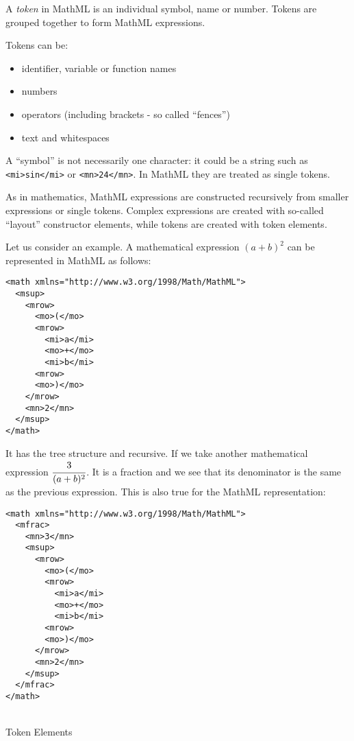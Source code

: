 A \emph{token} in MathML is an individual symbol, name or number. Tokens
are grouped together to form MathML expressions.

Tokens can be:

\begin{itemize}
\itemsep1pt\parskip0pt
\item
  identifier, variable or function names
\item
  numbers
\item
  operators (including brackets - so called ``fences'')
\item
  text and whitespaces
\end{itemize}

A ``symbol'' is not necessarily one character: it could be a string such
as \texttt{<mi>sin</mi>}
or \texttt{<mn>24</mn>}.
In MathML they are treated as single tokens.


As in mathematics, MathML expressions are constructed recursively from
smaller expressions or single tokens. Complex expressions are created
with so-called ``layout'' constructor elements, while tokens are created
with token elements.

Let us consider an example. A mathematical expression $(a + b)^2$
can be represented in MathML as follows:

\begin{verbatim}
<math xmlns="http://www.w3.org/1998/Math/MathML">
  <msup>
    <mrow>
      <mo>(</mo>
      <mrow>
        <mi>a</mi>
        <mo>+</mo>
        <mi>b</mi>
      <mrow>
      <mo>)</mo>
    </mrow>
    <mn>2</mn>
  </msup>
</math>
\end{verbatim}


It has the tree structure and recursive. If we take another mathematical
expression $\cfrac{3}{(a + b)^2}$. It is a
fraction and we see that its denominator is the same as the previous
expression. This is also true for the MathML representation:

\begin{verbatim}
<math xmlns="http://www.w3.org/1998/Math/MathML">
  <mfrac>
    <mn>3</mn>
    <msup>
      <mrow>
        <mo>(</mo>
        <mrow>
          <mi>a</mi>
          <mo>+</mo>
          <mi>b</mi>
        <mrow>
        <mo>)</mo>
      </mrow>
      <mn>2</mn>
    </msup>
  </mfrac>
</math>
\end{verbatim}

\ \\


Token Elements 

